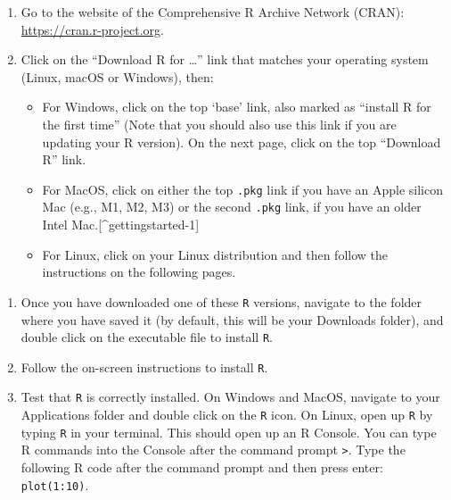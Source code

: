 \documentclass[
  letterpaper,
  DIV=11,
  numbers=noendperiod,
  oneside]{scrreprt}
\providecommand{\tightlist}{%
  \setlength{\itemsep}{0pt}\setlength{\parskip}{0pt}}\usepackage{longtable,booktabs,array}
\begin{document}
\begin{enumerate}
\def\labelenumi{\arabic{enumi}.}
\item
  Go to the website of the Comprehensive R Archive Network (CRAN):
  \url{https://cran.r-project.org}.
\item
  Click on the ``Download R for \ldots{}'' link that matches your
  operating system (Linux, macOS or Windows), then:

  \begin{itemize}
  \tightlist
  \item
    For Windows, click on the top `base' link, also marked as ``install
    R for the first time'' (Note that you should also use this link if
    you are updating your R version). On the next page, click on the top
    ``Download R'' link.
  \item
    For MacOS, click on either the top \texttt{.pkg} link if you have an
    Apple silicon Mac (e.g., M1, M2, M3) or the second \texttt{.pkg}
    link, if you have an older Intel Mac.{[}\^{}gettingstarted-1{]}
  \item
    For Linux, click on your Linux distribution and then follow the
    instructions on the following pages.
  \end{itemize}
\end{enumerate}

\begin{enumerate}
\def\labelenumi{\arabic{enumi}.}
\setcounter{enumi}{2}
\item
  Once you have downloaded one of these \texttt{R} versions, navigate to
  the folder where you have saved it (by default, this will be your
  Downloads folder), and double click on the executable file to install
  \texttt{R}.
\item
  Follow the on-screen instructions to install \texttt{R}.
\item
  Test that \texttt{R} is correctly installed. On Windows and MacOS,
  navigate to your Applications folder and double click on the
  \texttt{R} icon. On Linux, open up \texttt{R} by typing \texttt{R} in
  your terminal. This should open up an R Console. You can type R
  commands into the Console after the command prompt
  \texttt{\textgreater{}}. Type the following R code after the command
  prompt and then press enter: \texttt{plot(1:10)}.
\end{enumerate}
\end{document}
